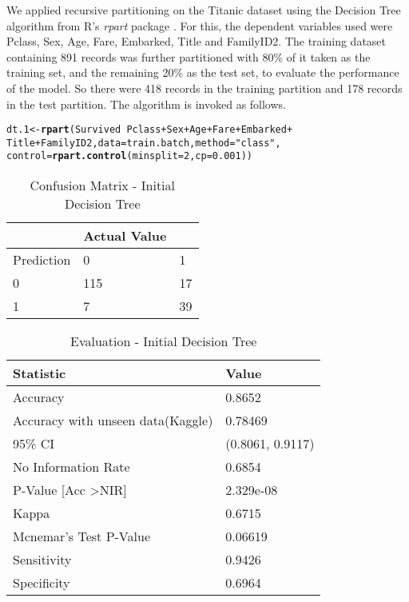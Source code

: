 \documentclass[a4paper,10pt]{report}\usepackage[]{graphicx}\usepackage[]{color}
\makeatletter
\newcommand{\hlnum}[1]{\textcolor[rgb]{0.686,0.059,0.569}{#1}}%
\newcommand{\hlstr}[1]{\textcolor[rgb]{0.192,0.494,0.8}{#1}}%
\newcommand{\hlopt}[1]{\textcolor[rgb]{0,0,0}{#1}}%
\newcommand{\hlstd}[1]{\textcolor[rgb]{0.345,0.345,0.345}{#1}}%
\newcommand{\hlkwb}[1]{\textcolor[rgb]{0.69,0.353,0.396}{#1}}%
\newcommand{\hlkwc}[1]{\textcolor[rgb]{0.333,0.667,0.333}{#1}}%
\newcommand{\hlkwd}[1]{\textcolor[rgb]{0.737,0.353,0.396}{\textbf{#1}}}%
\newenvironment{kframe}{%
 \def\at@end@of@kframe{}%
 \ifinner\ifhmode%
  \def\at@end@of@kframe{\end{minipage}}%
  \begin{minipage}{\columnwidth}%
 \fi\fi%
 \def\FrameCommand##1{\hskip\@totalleftmargin \hskip-\fboxsep
 \colorbox{shadecolor}{##1}\hskip-\fboxsep
     \hskip-\linewidth \hskip-\@totalleftmargin \hskip\columnwidth}%
 \MakeFramed {\advance\hsize-\width
   \@totalleftmargin\z@ \linewidth\hsize
   \@setminipage}}%
 {\par\unskip\endMakeFramed%
 \at@end@of@kframe}
\newenvironment{knitrout}{}{} %
\makeatother
\begin{document}
We applied recursive partitioning on the Titanic dataset using the Decision Tree algorithm from R's \emph{rpart} package . For this, the dependent variables used were Pclass, Sex, Age, Fare, Embarked, Title and FamilyID2. The training dataset containing 891 records was further partitioned with 80\% of it taken as the training set, and the remaining 20\% as the test set, to evaluate the performance of the model. So there were 418 records in the training partition and 178 records in the test partition. The algorithm is invoked as follows.
\begin{knitrout}
\color{fgcolor}\begin{kframe}
\begin{alltt}
\hlstd{dt.1} \hlkwb{<-} \hlkwd{rpart}\hlstd{(Survived} \hlopt{~} \hlstd{Pclass} \hlopt{+} \hlstd{Sex} \hlopt{+} \hlstd{Age} \hlopt{+} \hlstd{Fare} \hlopt{+} \hlstd{Embarked} \hlopt{+}
    \hlstd{Title} \hlopt{+} \hlstd{FamilyID2,} \hlkwc{data} \hlstd{= train.batch,} \hlkwc{method} \hlstd{=} \hlstr{"class"}\hlstd{,}
    \hlkwc{control} \hlstd{=} \hlkwd{rpart.control}\hlstd{(}\hlkwc{minsplit} \hlstd{=} \hlnum{2}\hlstd{,} \hlkwc{cp} \hlstd{=} \hlnum{0.001}\hlstd{))}
\end{alltt}
\end{kframe}
\end{knitrout}


\begin{table}
    \begin{tabular}{|l|l|l|}
    \hline
    ~          & Actual Value  & ~  \\ \hline
    Prediction & 0             & 1  \\ \hline
    0          & 115           & 17 \\
    1          & 7             & 39 \\ \hline
    \end{tabular}
    \caption{Confusion Matrix - Initial Decision Tree}
\end{table}

\begin{table}
    \begin{tabular}{|l|l|}
    \hline
    Statistic              & Value           \\ \hline
    Accuracy               & 0.8652          \\
    Accuracy with unseen data(Kaggle)               & 0.78469 \\ 
    95\% CI                & (0.8061, 0.9117) \\
    No Information Rate    & 0.6854          \\
    P-Value [Acc \textgreater NIR]    &  2.329e-08      \\
    Kappa                  &  0.6715         \\
    Mcnemar's Test P-Value & 0.06619          \\
    Sensitivity            &  0.9426         \\
    Specificity            & 0.6964          \\ \hline
    \end{tabular}
    \caption{Evaluation - Initial Decision Tree}
\end{table}
\end{document}
